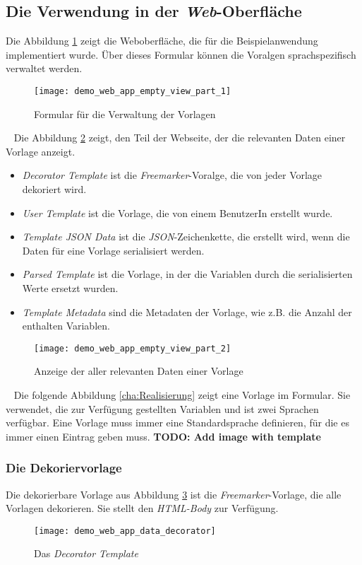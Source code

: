 \subsection{Die Verwendung in der \emph{Web}-Oberfläche}
Die Abbildung \ref{fig:demo_web_app_empty_view_part_1} zeigt die Weboberfläche, die für die Beispielanwendung implementiert wurde. Über dieses Formular können die Voralgen sprachspezifisch verwaltet werden.
\ \begin{figure}[h]
\centering
\texttt{[image: demo\_web\_app\_empty\_view\_part\_1]}
\caption{Formular für die Verwaltung der Vorlagen}
\label{fig:demo_web_app_empty_view_part_1}
\end{figure}
\ \newline
Die Abbildung \ref{fig:demo_web_app_empty_view_part_2} zeigt, den Teil der Webseite, der die relevanten Daten einer Vorlage anzeigt.
\begin{itemize}
	\item\emph{Decorator Template} ist die \emph{Freemarker}-Voralge, die von jeder Vorlage dekoriert wird.
	\item\emph{User Template} ist die Vorlage, die von einem BenutzerIn erstellt wurde.
	\item\emph{Template JSON Data} ist die \emph{JSON}-Zeichenkette, die erstellt wird, wenn die Daten für eine Vorlage serialisiert werden.
	\item\emph{Parsed Template} ist die Vorlage, in der die Variablen durch die serialisierten Werte ersetzt wurden.
	\item\emph{Template Metadata} sind die Metadaten der Vorlage, wie z.B. die Anzahl der enthalten Variablen.
\end{itemize}
\begin{figure}[h]
\centering
\texttt{[image: demo\_web\_app\_empty\_view\_part\_2]}
\caption{Anzeige der aller relevanten Daten einer Vorlage}
\label{fig:demo_web_app_empty_view_part_2}
\end{figure}
\ \newline
Die folgende Abbildung \ref{cha:Realisierung} zeigt eine Vorlage im Formular. Sie verwendet, die zur Verfügung gestellten Variablen und ist zwei Sprachen verfügbar. Eine Vorlage muss immer eine Standardsprache definieren, für die es immer einen Eintrag geben muss.
\newline
\textbf{TODO: Add image with template}
\newline
\subsubsection{Die Dekoriervorlage}
Die dekorierbare Vorlage aus Abbildung \ref{fig:demo_web_app_data_decorator} ist die \emph{Freemarker}-Vorlage, die alle Vorlagen dekorieren. Sie stellt den \emph{HTML-Body} zur Verfügung.
\begin{figure}[h]
\centering
\texttt{[image: demo\_web\_app\_data\_decorator]}
\caption{Das \emph{Decorator Template}}
\label{fig:demo_web_app_data_decorator}
\end{figure}
